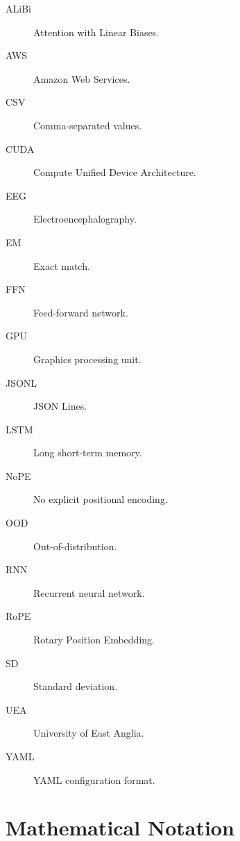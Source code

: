 \documentclass[
    author={Aanchala Ravindra Bhongade},
    supervisor={Dr. Fernando Moreno-Pino},
    degree={MSc},
    title={Length Generalisation in Transformer-Based Sequence Models: Failure Taxonomy and Mitigation Strategies},
    subtitle={},
    type={},
    year={2026}
]{dissertation}
\begin{document}
\begin{description}
    \item[ALiBi] Attention with Linear Biases.
    \item[AWS] Amazon Web Services.
    \item[CSV] Comma-separated values.
    \item[CUDA] Compute Unified Device Architecture.
    \item[EEG] Electroencephalography.
    \item[EM] Exact match.
    \item[FFN] Feed-forward network.
    \item[GPU] Graphics processing unit.
    \item[JSONL] JSON Lines.
    \item[LSTM] Long short-term memory.
    \item[NoPE] No explicit positional encoding.
    \item[OOD] Out-of-distribution.
    \item[RNN] Recurrent neural network.
    \item[RoPE] Rotary Position Embedding.
    \item[SD] Standard deviation.
    \item[UEA] University of East Anglia.
    \item[YAML] YAML configuration format.
\end{description}

\section*{Mathematical Notation}
\end{document}
